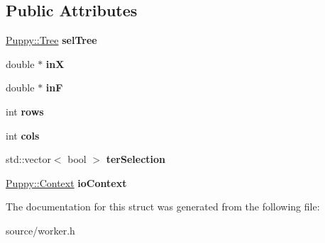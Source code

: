 \subsection*{Public Attributes}
\begin{DoxyCompactItemize}
\item 
\hypertarget{structWorker_1_1OneTree_ab07dff55ad074fcbec94d809b0edfe8f}{}\hyperlink{classPuppy_1_1Tree}{Puppy\+::\+Tree} {\bfseries sel\+Tree}\label{structWorker_1_1OneTree_ab07dff55ad074fcbec94d809b0edfe8f}

\item 
\hypertarget{structWorker_1_1OneTree_ad999d3b95d626ba7ad697ce26d2a0bf9}{}double $\ast$ {\bfseries in\+X}\label{structWorker_1_1OneTree_ad999d3b95d626ba7ad697ce26d2a0bf9}

\item 
\hypertarget{structWorker_1_1OneTree_a6e05fd4bbc1774fdfc82c2c6e73c4860}{}double $\ast$ {\bfseries in\+F}\label{structWorker_1_1OneTree_a6e05fd4bbc1774fdfc82c2c6e73c4860}

\item 
\hypertarget{structWorker_1_1OneTree_a64d1a9ad0a9cfe03d2225f4e89f8ea53}{}int {\bfseries rows}\label{structWorker_1_1OneTree_a64d1a9ad0a9cfe03d2225f4e89f8ea53}

\item 
\hypertarget{structWorker_1_1OneTree_ac75b7812f9012c9695742f268e991fa6}{}int {\bfseries cols}\label{structWorker_1_1OneTree_ac75b7812f9012c9695742f268e991fa6}

\item 
\hypertarget{structWorker_1_1OneTree_a2e846fc526debedcf594ecad18661af5}{}std\+::vector$<$ bool $>$ {\bfseries ter\+Selection}\label{structWorker_1_1OneTree_a2e846fc526debedcf594ecad18661af5}

\item 
\hypertarget{structWorker_1_1OneTree_aa7c4ca8e12cd50f01c3df2daf380415b}{}\hyperlink{classPuppy_1_1Context}{Puppy\+::\+Context} {\bfseries io\+Context}\label{structWorker_1_1OneTree_aa7c4ca8e12cd50f01c3df2daf380415b}

\end{DoxyCompactItemize}


The documentation for this struct was generated from the following file\+:\begin{DoxyCompactItemize}
\item 
source/worker.\+h\end{DoxyCompactItemize}
